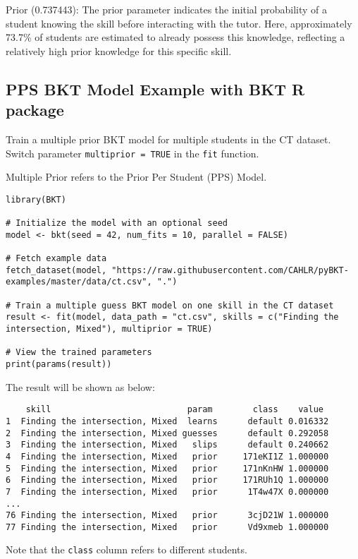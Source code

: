 \documentclass{article}
\begin{document}
Prior (0.737443): The prior parameter indicates the initial probability of a student knowing the skill before interacting with the tutor. Here, approximately 73.7\% of students are estimated to already possess this knowledge, reflecting a relatively high prior knowledge for this specific skill.

\subsection{PPS BKT Model Example with BKT R package}

Train a multiple prior BKT model for multiple students in the CT dataset. Switch parameter \texttt{multiprior = TRUE} in the \texttt{fit} function.

Multiple Prior refers to the Prior Per Student (PPS) Model.

\begin{lstlisting}[caption={R code to train a PPS BKT model}]
library(BKT)

# Initialize the model with an optional seed
model <- bkt(seed = 42, num_fits = 10, parallel = FALSE)

# Fetch example data
fetch_dataset(model, "https://raw.githubusercontent.com/CAHLR/pyBKT-examples/master/data/ct.csv", ".")

# Train a multiple guess BKT model on one skill in the CT dataset
result <- fit(model, data_path = "ct.csv", skills = c("Finding the intersection, Mixed"), multiprior = TRUE)

# View the trained parameters
print(params(result))
\end{lstlisting}

The result will be shown as below:

\begin{verbatim}
    skill                           param        class    value
1  Finding the intersection, Mixed  learns      default 0.016332
2  Finding the intersection, Mixed guesses      default 0.292058
3  Finding the intersection, Mixed   slips      default 0.240662
4  Finding the intersection, Mixed   prior     171eKI1Z 1.000000
5  Finding the intersection, Mixed   prior     171nKnHW 1.000000
6  Finding the intersection, Mixed   prior     171RUh1Q 1.000000
7  Finding the intersection, Mixed   prior      1T4w47X 0.000000
...
76 Finding the intersection, Mixed   prior      3cjD21W 1.000000
77 Finding the intersection, Mixed   prior      Vd9xmeb 1.000000
\end{verbatim}
    
Note that the \texttt{class} column refers to different students.
\end{document}
